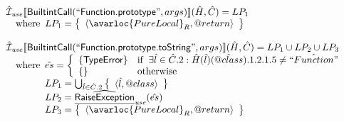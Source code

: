 \[
\begin{array}{l}

\aI_{\it use}\lbr \SF{BuiltintCall}(``\SF{Function.prototype}",args)\rbr(\hat{H},\hat{C}) = LP_1\\
\quad\wherec{
  LP_1 = \set{\langle\avarloc{PureLocal}_R,\varprop{return}\rangle}\\
  }\\
\\

\aI_{\it use}\lbr \SF{BuiltintCall}(``\SF{Function.prototype.toString}",args)\rbr(\hat{H},\hat{C}) = LP_1 \cup LP_2 \cup LP_3\\
\quad\wherec{
  \hat{es} = \left\{\begin{array}{ll}
      \{ \SF{TypeError} \}
      & \ifc{\exists\hat{l}\in\hat{C}.2: \hat{H}(\hat{l})(\avarprop{class}).1.2.1.5 \neq \hat{``Function"}}\\
      \set{} & \owc
    \end{array}\right.\\
  LP_1 = \bigcup_{\hat{l} \in \hat{C}.2} \set{\langle \hat{l},\varprop{class} \rangle}\\
  LP_2 = \ahf{RaiseException}_{\it use}(\hat{es})\\
  LP_3 = \set{\langle\avarloc{PureLocal}_R,\varprop{return}\rangle}\\
  }\\
\\



\end{array}\]
